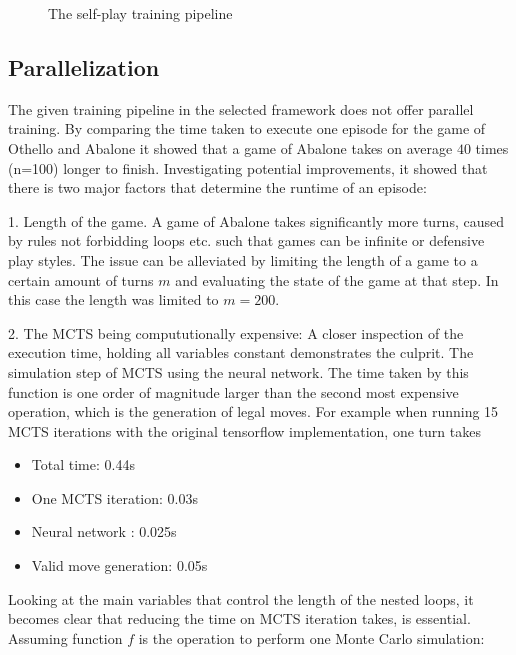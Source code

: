\begin{figure}[H]
    \centering
    \caption{The self-play training pipeline}
    \label{training_algorithm}
\end{figure}

\subsection{Parallelization}
The given training pipeline in the selected framework does not offer parallel training. By comparing the time taken to execute one episode for the game of Othello and Abalone it showed that a game of Abalone takes on average $40$ times (n=100) longer to finish. Investigating potential improvements, it showed that there is two major factors that determine the runtime of an episode:

1. Length of the game. A game of Abalone takes significantly more turns, caused by rules not forbidding loops etc. such that games can be infinite or defensive play styles. The issue can be alleviated by limiting the length of a game to a certain amount of turns $m$ and evaluating the state of the game at that step. In this case the length was limited to $m=200$.

2. The MCTS being compututionally expensive: A closer inspection of the execution time, holding all variables constant demonstrates the culprit. The simulation step of MCTS using the neural network. The time taken by this function is one order of magnitude larger than the second most expensive operation, which is the generation of legal moves. For example when running 15 MCTS iterations with the original tensorflow implementation, one turn takes

\begin{itemize}
    \item Total time: 0.44s
    \item One MCTS iteration: 0.03s
    \item Neural network : 0.025s
    \item Valid move generation: 0.05s
\end{itemize}

Looking at the main variables that control the length of the nested loops, it becomes clear that reducing the time on MCTS iteration takes, is essential. Assuming function $f$ is the operation to perform one Monte Carlo simulation:

